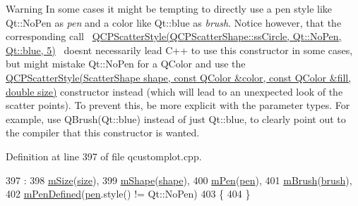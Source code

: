 \begin{DoxyWarning}{Warning}
In some cases it might be tempting to directly use a pen style like {\ttfamily Qt\+::\+No\+Pen} as {\itshape pen} and a color like {\ttfamily Qt\+::blue} as {\itshape brush}. Notice however, that the corresponding call~\newline
{\ttfamily \hyperlink{class_q_c_p_scatter_style}{Q\+C\+P\+Scatter\+Style(\+Q\+C\+P\+Scatter\+Shape\+::ss\+Circle, Qt\+::\+No\+Pen, Qt\+::blue, 5)}}~\newline
doesn\textquotesingle{}t necessarily lead C++ to use this constructor in some cases, but might mistake {\ttfamily Qt\+::\+No\+Pen} for a Q\+Color and use the \hyperlink{class_q_c_p_scatter_style_a6e1b64f12cac7f07af180ae4316fd38d}{Q\+C\+P\+Scatter\+Style(\+Scatter\+Shape shape, const Q\+Color \&color, const Q\+Color \&fill, double size)} constructor instead (which will lead to an unexpected look of the scatter points). To prevent this, be more explicit with the parameter types. For example, use {\ttfamily Q\+Brush(\+Qt\+::blue)} instead of just {\ttfamily Qt\+::blue}, to clearly point out to the compiler that this constructor is wanted. 
\end{DoxyWarning}


Definition at line 397 of file qcustomplot.\+cpp.


\begin{DoxyCode}
397                                                                                                       :
398   \hyperlink{class_q_c_p_scatter_style_a757da98671eb06b221979373ac2cec91}{mSize}(\hyperlink{class_q_c_p_scatter_style_a1973ee650368f1c5f55507b78473f634}{size}),
399   \hyperlink{class_q_c_p_scatter_style_af1b327f35f107ed108290187bbc8c7c6}{mShape}(\hyperlink{class_q_c_p_scatter_style_a4462a25ef17769631f4e0aa81dadca4b}{shape}),
400   \hyperlink{class_q_c_p_scatter_style_a0f6a85e6d1e3ae1ca1b6efb4d4cdfe17}{mPen}(\hyperlink{class_q_c_p_scatter_style_a3c24c3bf37b561b4807aed9f1418ab58}{pen}),
401   \hyperlink{class_q_c_p_scatter_style_a1b9c6ab10aebcaf236f1f45d1d6d64d1}{mBrush}(\hyperlink{class_q_c_p_scatter_style_a46bf481d84bfa31b287dd43a3bf86d37}{brush}),
402   \hyperlink{class_q_c_p_scatter_style_a84ef5aa591ddba07b440f597e1669e78}{mPenDefined}(\hyperlink{class_q_c_p_scatter_style_a3c24c3bf37b561b4807aed9f1418ab58}{pen}.style() != Qt::NoPen)
403 \{
404 \}
\end{DoxyCode}
\hypertarget{class_q_c_p_scatter_style_a63962094587a4c2258435aa7933996cc}{}
